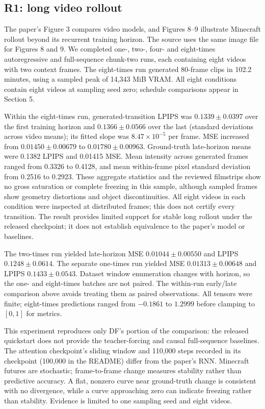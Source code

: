 \subsection{R1: long video rollout}
The paper's Figure 3 compares video models, and Figures 8--9 illustrate Minecraft rollout beyond its recurrent training horizon. The source uses the same image file for Figures 8 and 9. We completed one-, two-, four- and eight-times autoregressive and full-sequence chunk-two runs, each containing eight videos with two context frames. The eight-times run generated 80-frame clips in 102.2 minutes, using a sampled peak of 14,343 MiB VRAM. All eight conditions contain eight videos at sampling seed zero; schedule comparisons appear in Section 5.

Within the eight-times run, generated-transition LPIPS was $0.1339\pm0.0397$ over the first training horizon and $0.1366\pm0.0566$ over the last (standard deviations across video means); its fitted slope was $8.47\times10^{-5}$ per frame. MSE increased from $0.01450\pm0.00679$ to $0.01780\pm0.00963$. Ground-truth late-horizon means were 0.1382 LPIPS and 0.01415 MSE. Mean intensity across generated frames ranged from 0.3326 to 0.4128, and mean within-frame pixel standard deviation from 0.2516 to 0.2923. These aggregate statistics and the reviewed filmstrips show no gross saturation or complete freezing in this sample, although sampled frames show geometry distortions and object discontinuities. All eight videos in each condition were inspected at distributed frames; this does not certify every transition. The result provides limited support for stable long rollout under the released checkpoint; it does not establish equivalence to the paper's model or baselines.

The two-times run yielded late-horizon MSE $0.01044\pm0.00550$ and LPIPS $0.1248\pm0.0614$. The separate one-times run yielded MSE $0.01313\pm0.00648$ and LPIPS $0.1433\pm0.0543$. Dataset window enumeration changes with horizon, so the one- and eight-times batches are not paired. The within-run early/late comparison above avoids treating them as paired observations. All tensors were finite; eight-times predictions ranged from $-0.1861$ to $1.2999$ before clamping to $[0,1]$ for metrics.

This experiment reproduces only DF's portion of the comparison: the released quickstart does not provide the teacher-forcing and causal full-sequence baselines. The attention checkpoint's sliding window and 110,000 steps recorded in its checkpoint (100,000 in the README) differ from the paper's RNN. Minecraft futures are stochastic; frame-to-frame change measures stability rather than predictive accuracy. A flat, nonzero curve near ground-truth change is consistent with no divergence, while a curve approaching zero can indicate freezing rather than stability. Evidence is limited to one sampling seed and eight videos.

